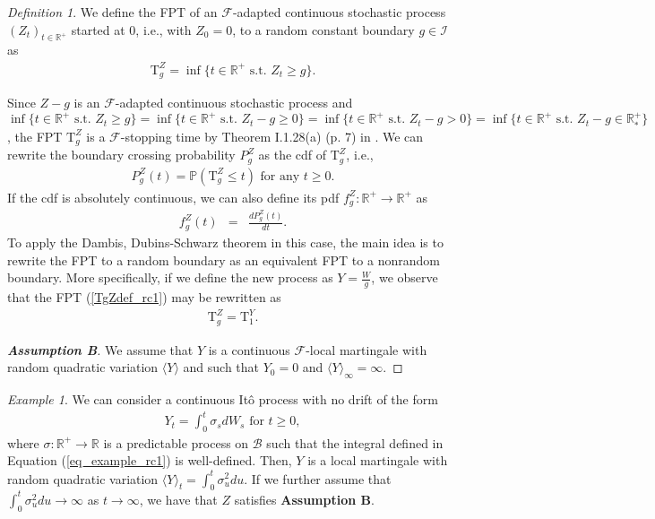 \documentclass[aop]{imsart}
\theoremstyle{plain}
\theoremstyle{remark}
\newtheorem{definition}[theorem]{Definition}
\newtheorem*{example}{Example}
\newcommand{\reels}{\mathbb{R}}
\newcommand{\proba}{\mathbb{P}}
\newcommand{\Tau}{\mathrm{T}}
\begin{document}
\begin{definition}\label{defFPT_rc1}
We define the FPT of an $\mathcal{F}$-adapted continuous stochastic process $(Z_t)_{t \in \reels^+}$ started at 0, i.e., with $Z_0=0$, to a random constant boundary
$g \in \mathcal{I}$ as
\begin{eqnarray}
\label{TgZdef_rc1}
\Tau_g^Z = \inf \{t \in \reels^+ \text{ s.t. } Z_t \geq g\}.
\end{eqnarray}
\end{definition}
\noindent Since $Z-g$ is an $\mathcal{F}$-adapted continuous stochastic process and $\inf \{t \in \reels^+ \text{ s.t. } Z_t \geq g\} = \inf \{t \in \reels^+ \text{ s.t. } Z_t - g \geq 0\} = \inf \{t \in \reels^+ \text{ s.t. } Z_t - g > 0\} = \inf \{t \in \reels^+ \text{ s.t. } Z_t - g \in \reels^+_*\}$, the FPT $\Tau_{g}^{Z}$ is a $\mathcal{F}$-stopping time by Theorem I.1.28(a) (p. 7) in \cite{JacodLimit2003}. We can rewrite the boundary crossing probability $P_g^Z$ as the cdf of $\Tau_g^Z$, i.e., 
\begin{eqnarray}
\label{PgZdef_rc1}
P_g^Z(t)= \proba (\Tau^Z_g \leq t) \text{ for any } t \geq 0.
\end{eqnarray}
If the cdf is absolutely continuous, we can also define its pdf $f_g^Z: \reels^+  \rightarrow  \reels^+$ as
\begin{eqnarray}
\label{fZgt_rc1}
f_g^Z(t) & = & \frac{dP_g^Z(t)}{dt}.
\end{eqnarray}
\noindent To apply the Dambis, Dubins-Schwarz theorem in this case, the main idea is to rewrite the FPT to a random boundary as an equivalent FPT to a nonrandom boundary. More specifically, if we define the new process as $Y = \frac{W}{g}$, we observe that the FPT (\ref{TgZdef_rc1}) may be rewritten as 
\begin{eqnarray}
\Tau_g^Z = \Tau_{1}^Y.
\end{eqnarray}

\begin{proof}[\textbf{Assumption B}]
We assume that $Y$ is a continuous $\mathcal{F}$-local martingale with random quadratic variation $\langle Y\rangle$ and such that $Y_0=0$ and $\langle Y\rangle_{\infty} = \infty$.
\phantom\qedhere
\end{proof} 
\begin{example}
We can consider a continuous It\^{o} process with no drift of the form 
\begin{eqnarray}
\label{eq_example_rc1}
Y_t = \int_0^t \sigma_s dW_s \text{ for } t \geq 0,
\end{eqnarray}
where $\sigma : \reels^+ \rightarrow \reels $ is a predictable process on $\mathcal{B}$ such that the integral defined in Equation (\ref{eq_example_rc1}) is well-defined. Then, $Y$ is a local martingale with random quadratic variation $\langle Y\rangle_{t} = \int_0^t \sigma_u^2 du$. If we further assume that $\int_0^t \sigma_u^2 du \rightarrow \infty$ as $t \rightarrow \infty$, we have that $Z$ satisfies \textbf{Assumption B}.
\end{example}
\end{document}
